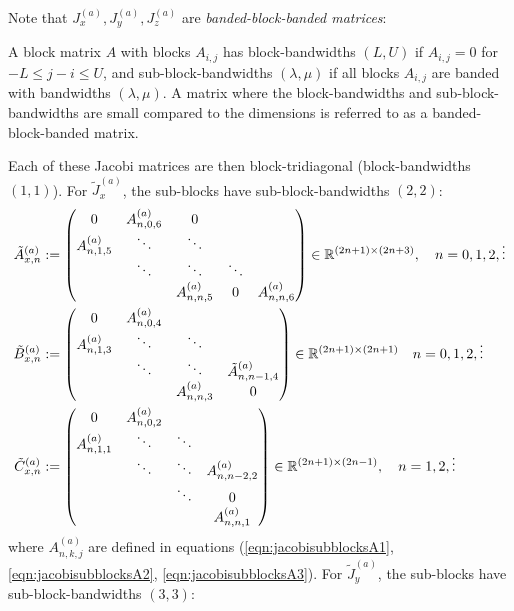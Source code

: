 \documentclass[11pt, oneside]{article}   	%
\begin{document}
Note that $J_x^{(a)}, J_y^{(a)}, J_z^{(a)}$ are \textit{banded-block-banded matrices}:

\begin{definition}
	A block matrix $A$ with blocks $A_{i,j}$ has block-bandwidths $(L,U)$ if $A_{i,j} = 0$ for $- L \leq j-i \leq U$, and sub-block-bandwidths $(\lambda, \mu)$ if all blocks $A_{i,j}$ are banded with bandwidths $(\lambda,\mu)$. A matrix where the block-bandwidths and sub-block-bandwidths are small compared to the dimensions is referred to as a banded-block-banded matrix. 
\end{definition}

Each of these Jacobi matrices are then block-tridiagonal (block-bandwidths $(1,1)$). For $\tilde J_x^{(a)}$, the sub-blocks have sub-block-bandwidths $(2,2)$:
\begin{align*}
	\tilde A^{(a)}_{x,n} &:= 
		\begin{pmatrix}
			0 & A^{(a)}_{n,0,6} & 0 & & \\
			A^{(a)}_{n,1,5} & \ddots & \ddots & & \\
			& \ddots & \ddots & \ddots & \\
			& & A^{(a)}_{n,n,5} & 0 & A^{(a)}_{n,n,6} \\
		\end{pmatrix} \in \mathbb{R}^{(2n+1)\times(2n+3)}, \quad n = 0,1,2,\vdots \\
	\tilde B^{(a)}_{x,n} &:= 
		\begin{pmatrix}
			0 & A^{(a)}_{n,0,4} & & \\
			A^{(a)}_{n,1,3} & \ddots & \ddots & \\
			& \ddots & \ddots & \tilde A^{(a)}_{n,n-1,4} \\
			& & A^{(a)}_{n,n,3} & 0
		\end{pmatrix} \in \mathbb{R}^{(2n+1)\times(2n+1)}  \quad n = 0,1,2,\vdots \\
	\tilde C^{(a)}_{x,n} &:= 
		\begin{pmatrix}
			0 & A^{(a)}_{n,0,2} & & \\
			A^{(a)}_{n,1,1} & \ddots & \ddots & \\
			& \ddots & \ddots &A^{(a)}_{n,n-2,2} \\
			& & \ddots & 0 \\
			& & & A^{(a)}_{n,n,1} \\
		\end{pmatrix} \in \mathbb{R}^{(2n+1)\times(2n-1)}, \quad n = 1,2,\vdots
\end{align*}
where $A^{(a)}_{n,k,j}$ are defined in equations (\ref{eqn:jacobisubblocksA1}, \ref{eqn:jacobisubblocksA2}, \ref{eqn:jacobisubblocksA3}). For $\tilde J_y^{(a)}$, the sub-blocks have sub-block-bandwidths $(3,3)$:
\end{document}
